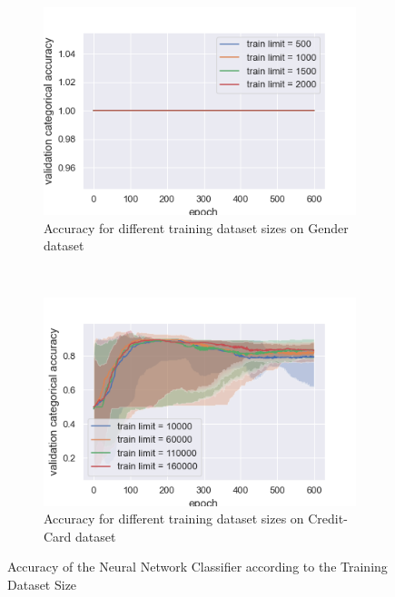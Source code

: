 \documentclass[10pt]{article}
\begin{document}
		\paragraph*{}
			\begin{figure}[h]
				\centering
				\begin{subfigure}[]{0.45\columnwidth}
					\centering
					\includegraphics[width=\linewidth]{../graphics/per_gender_epoch_score_type_train_limit.png}
					\caption{Accuracy for different training dataset sizes on Gender dataset}
					\label{nn:g_tl}
				\end{subfigure}
				~
				\begin{subfigure}[]{0.45\columnwidth}
					\centering
					\includegraphics[width=\linewidth]{../graphics/per_creditcard_epoch_score_type_train_limit.png}
					\caption{Accuracy for different training dataset sizes on Credit-Card dataset}
					\label{nn:cc_tl}
				\end{subfigure}
				\caption{Accuracy of the Neural Network Classifier according to the Training Dataset Size}
				\label{nn:size}
			\end{figure}
\end{document}
